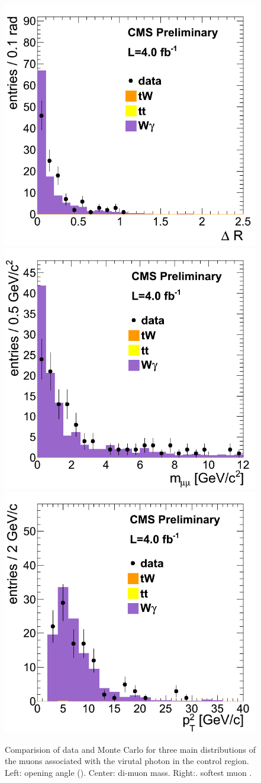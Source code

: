 \begin{figure}[hbt]
\begin{center}
\includegraphics[width=0.3\linewidth]{figures/WGammaStar_dR.png} 
\includegraphics[width=0.3\linewidth]{figures/WGammaStar_mass.png}
\includegraphics[width=0.3\linewidth]{figures/WGammaStar_3rdLep.png}
\caption{\label{fig:WgammaStar}\protect Comparision of data and Monte Carlo for three 
main distributions of the muons associated with the virutal photon in the \Wgstar control region. 
Left: opening angle (\delR).
Center: di-muon mass.
Right:. softest muon \pt.}
\end{center}
\end{figure}



